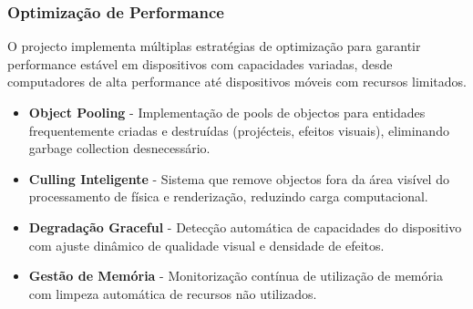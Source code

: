 \subsubsection{Optimização de Performance}
\hspace{2em} O projecto implementa múltiplas estratégias de optimização para garantir performance estável em dispositivos com capacidades variadas, desde computadores de alta performance até dispositivos móveis com recursos limitados.

\begin{itemize}
  \item \textbf{Object Pooling} - Implementação de pools de objectos para entidades frequentemente criadas e destruídas (projécteis, efeitos visuais), eliminando garbage collection desnecessário.
  
  \item \textbf{Culling Inteligente} - Sistema que remove objectos fora da área visível do processamento de física e renderização, reduzindo carga computacional.
  
  \item \textbf{Degradação Graceful} - Detecção automática de capacidades do dispositivo com ajuste dinâmico de qualidade visual e densidade de efeitos.
  
  \item \textbf{Gestão de Memória} - Monitorização contínua de utilização de memória com limpeza automática de recursos não utilizados.
\end{itemize}
